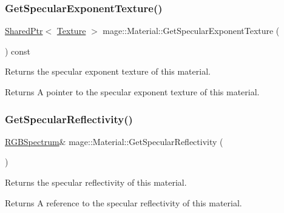 \subsubsection{\texorpdfstring{Get\+Specular\+Exponent\+Texture()}{GetSpecularExponentTexture()}}
{\footnotesize\ttfamily \hyperlink{namespacemage_a1e01ae66713838a7a67d30e44c67703e}{Shared\+Ptr}$<$ \hyperlink{classmage_1_1_texture}{Texture} $>$ mage\+::\+Material\+::\+Get\+Specular\+Exponent\+Texture (\begin{DoxyParamCaption}{ }\end{DoxyParamCaption}) const\hspace{0.3cm}{\ttfamily [noexcept]}}

Returns the specular exponent texture of this material.

\begin{DoxyReturn}{Returns}
A pointer to the specular exponent texture of this material. 
\end{DoxyReturn}
\hypertarget{structmage_1_1_material_ad5fde8d972471fc99b72a4fc969883b1}{}\label{structmage_1_1_material_ad5fde8d972471fc99b72a4fc969883b1} 
\subsubsection{\texorpdfstring{Get\+Specular\+Reflectivity()}{GetSpecularReflectivity()}\hspace{0.1cm}{\footnotesize\ttfamily [1/2]}}
{\footnotesize\ttfamily \hyperlink{structmage_1_1_r_g_b_spectrum}{R\+G\+B\+Spectrum}\& mage\+::\+Material\+::\+Get\+Specular\+Reflectivity (\begin{DoxyParamCaption}{ }\end{DoxyParamCaption})\hspace{0.3cm}{\ttfamily [noexcept]}}

Returns the specular reflectivity of this material.

\begin{DoxyReturn}{Returns}
A reference to the specular reflectivity of this material. 
\end{DoxyReturn}
\hypertarget{structmage_1_1_material_a81005b5094b99b9a8d7f16bedd195718}{}\label{structmage_1_1_material_a81005b5094b99b9a8d7f16bedd195718} 

